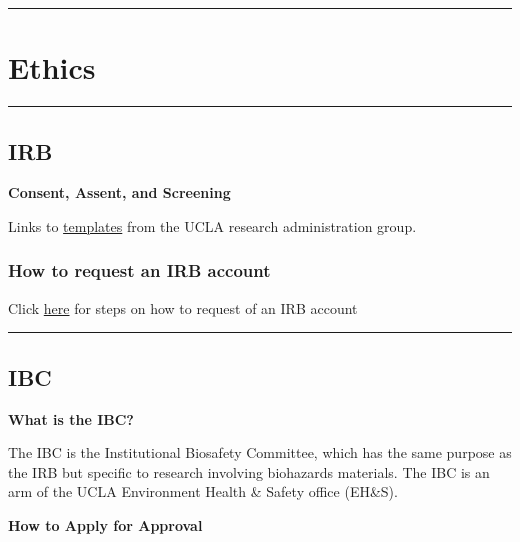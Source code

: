 \documentclass[]{book}
\begin{document}
\begin{center}\rule{0.5\linewidth}{0.5pt}\end{center}

\hypertarget{ethics}{%
\section{Ethics}\label{ethics}}

\begin{center}\rule{0.5\linewidth}{0.5pt}\end{center}

\hypertarget{irb}{%
\subsection{IRB}\label{irb}}

\textbf{Consent, Assent, and Screening}

Links to \href{https://ohrpp.research.ucla.edu/consent-templates/}{templates} from the UCLA research administration group.

\hypertarget{how-to-request-an-irb-account}{%
\subsubsection{How to request an IRB account}\label{how-to-request-an-irb-account}}

Click \href{https://webirb.research.ucla.edu/WEBIRB/Rooms/DisplayPages/LayoutInitial?Container=com.webridge.entity.Entity\%5BOID\%5B8990716E5E076B40BFE2D4D479617FD3\%5D\%5D}{here} for steps on how to request of an IRB account

\begin{center}\rule{0.5\linewidth}{0.5pt}\end{center}

\hypertarget{ibc}{%
\subsection{IBC}\label{ibc}}

\textbf{What is the IBC?}

The IBC is the Institutional Biosafety Committee, which has the same purpose as the IRB but specific to research involving biohazards materials. The IBC is an arm of the UCLA Environment Health \& Safety office (EH\&S).

\textbf{How to Apply for Approval}
\end{document}
